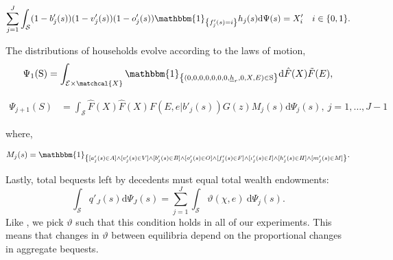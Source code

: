 \documentclass[parskip=full]{article}
\newcommand{\indicator}[1]{\mathbbm{1}_{\left\{ {#1} \right\} }}
\begin{document}
\begin{equation}
\label{eq:rental_housing_clearing_condition}
  \sum_{j=1}^J \int_\mathcal{S} (1-b'_{j}(s))(1-v'_{j}(s)) (1-o'_{j}(s))\indicator{f'_{j}(s)=i}h_{j}(s) \mathrm{d}\Psi(s) = X'_{i} \quad i \in \{0,1\}.
\end{equation}

The distributions of households evolve according to the laws of motion,
\begin{align}\label{eq:lom2}
\Psi_{1}(\mathrm{S})=\int_{\mathcal{E} \times \matchcal{X}} \indicator{(0,0,0,0,0,0,0,\underline{h}_{r},0,X,E)\in \mathrm{S}}\mathrm{d} \hat{F}(X)\tilde{F}(E),
\end{align}

\begin{align}
\Psi_{j+1}(S) &=\int_{\mathcal{S}} \hat{F}(X)\hat{F}(X)F(E,e|b'_{j}(s))G(z)M_{j}(s)\mathrm{d}\Psi_{j}(s),\ j=1,\ldots,J-1\label{eq:lom1}
\end{align}

\noindent where,

\begin{align}
    M_{j}(s) = \indicator{[a'_{j}(s)\in A] \land [v'_{j}(s)\in V] \land [b'_{j}(s)\in B] \land [o'_{j}(s)\in O] \land [f'_{j}(s)\in F] \land [\iota'_{j}(s)\in I] \land [h'_{j}(s) \in H] \land [m'_{j}(s) \in M]}.\notag
\end{align}

Lastly, total bequests left by decedents must equal total wealth endowments:
\begin{equation}
\label{lom:agg_bequests}
      \int_{\mathcal{S}} q'_{J}(s) \mathrm{d}\Psi_{J}(s) =  \sum_{j=1}^J \int_{\mathcal{S}} \vartheta (\chi,e)\ \mathrm{d}\Psi_j(s).
\end{equation}
Like \citet{kkk-2021}, we pick $\vartheta$ such that this condition holds in all of our experiments. This means that changes in $\vartheta$ between equilibria depend on the proportional changes in aggregate bequests.
\end{document}
